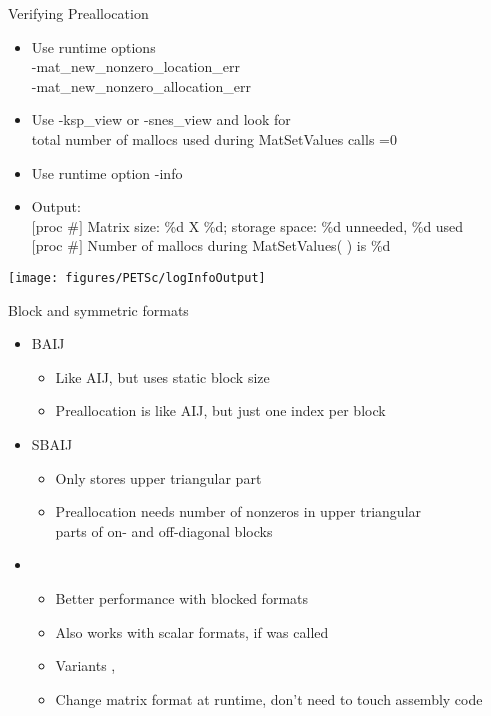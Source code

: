 \begin{frame}{Verifying Preallocation}
\begin{itemize}
  \item Use runtime options \\
    {\kb -mat\_new\_nonzero\_location\_err} \\
    {\kb -mat\_new\_nonzero\_allocation\_err}
  \item Use {\kb -ksp\_view} or {\kb -snes\_view} and look for \\
    {\kb total number of mallocs used during MatSetValues calls =0}
  \item Use runtime option {\kb -info}
  \item Output: \\
{\kb
  $[$proc \#$]$ Matrix size: \%d X \%d; storage space: \%d unneeded, \%d used \\
  $[$proc \#$]$ Number of mallocs during MatSetValues( )  is \%d
}
\end{itemize}

\bigskip

\begin{center}
\texttt{[image: figures/PETSc/logInfoOutput]}
\end{center}
\end{frame}

\begin{frame}{Block and symmetric formats}
  \begin{itemize}
  \item BAIJ
    \begin{itemize}
    \item Like AIJ, but uses static block size
    \item Preallocation is like AIJ, but just one index per block
    \end{itemize}
  \item SBAIJ
    \begin{itemize}
    \item Only stores upper triangular part
    \item Preallocation needs number of nonzeros in upper triangular \\
      parts of on- and off-diagonal blocks
    \end{itemize}
  \item {}
    \begin{itemize}
    \item Better performance with blocked formats
    \item Also works with scalar formats, if  was called
    \item Variants , 
    \item Change matrix format at runtime, don't need to touch assembly code
    \end{itemize}
  \end{itemize}
\end{frame}
